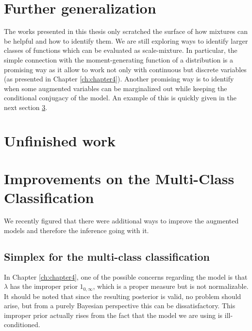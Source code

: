 

\graphicspath{{8/figures/}}


\section{Further generalization}
The works presented in this thesis only scratched the surface of how mixtures can be helpful and how to identify them.
We are still exploring ways to identify larger classes of functions which can be evaluated as scale-mixture.
In particular, the simple connection with the moment-generating function of a distribution is a promising way as it allow to work not only with continuous but discrete variables (as presented in Chapter \ref{ch:chapter4}).
Another promising way is to identify when some augmented variables can be marginalized out while keeping the conditional conjugacy of the model.
An example of this is quickly given in the next section \ref{sec:improve}.

\section{Unfinished work}

\section{Improvements on the Multi-Class Classification}
\label{sec:improve}
We recently figured that there were additional ways to improve the augmented models and therefore the inference going with it.

\subsection{Simplex for the multi-class classification}
In Chapter \ref{ch:chapter4}, one of the possible concerns regarding the model is that $\lambda$ has the improper prior $\mathcal{1}_{0,\infty}$, which is a proper measure but is not normalizable.
It should be noted that since the resulting posterior is valid, no problem should arise, but from a purely Bayesian perspective this can be dissatisfactory.
This improper prior actually rises from the fact that the model we are using is ill-conditioned.




